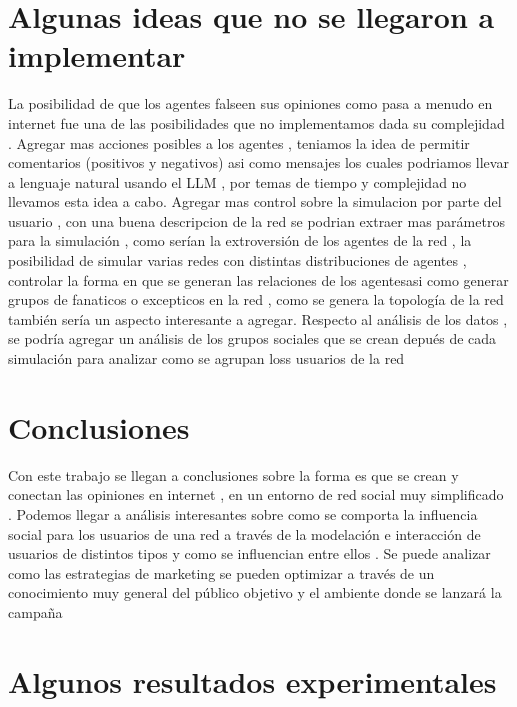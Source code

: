 \documentclass[acmtog]{acmart}
\begin{document}
\section{Algunas ideas que no se llegaron a implementar}
La posibilidad de que los agentes falseen sus opiniones como pasa a menudo en internet fue una de las posibilidades que no implementamos dada su complejidad . Agregar mas acciones posibles a los agentes , teniamos la idea de permitir comentarios (positivos y negativos) asi como mensajes los cuales podriamos llevar a lenguaje natural usando el LLM , por temas de tiempo y complejidad no llevamos esta idea a cabo. Agregar mas control sobre la simulacion por parte del usuario , con una buena descripcion de la red se podrian extraer mas parámetros para la simulación , como serían la extroversión de los agentes de la red , la posibilidad de simular varias redes con distintas distribuciones de agentes , controlar la forma en que se generan las relaciones de los agentesasi como generar grupos de fanaticos o excepticos en la red , como se genera la topología de la red también sería un aspecto interesante a agregar. Respecto al análisis de los datos , se podría agregar un análisis de los grupos sociales que se crean depués de cada simulación para analizar como se agrupan loss usuarios de la red

\section{Conclusiones}
Con este trabajo se llegan a conclusiones sobre la forma es que se crean y conectan las opiniones en internet , en un entorno de red social muy simplificado . Podemos llegar a análisis interesantes sobre como se comporta la influencia social para los usuarios de una red a través de la modelación e interacción de usuarios de distintos tipos y como se influencian entre ellos . Se puede analizar como las estrategias de marketing se pueden optimizar a través de un conocimiento muy general del público objetivo y el ambiente donde se lanzará la campaña

\section{Algunos resultados experimentales}
\end{document}
